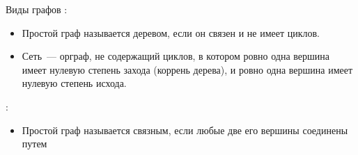 \documentclass[unicode,11pt,notheorems]{beamer}
\begin{document}


\begin{frame}{Виды графов}
:
\begin{itemize}

	\item 
		Простой граф называется \alert{деревом}, если он  связен и не имеет циклов.
	\item 
		\alert{Сеть}~--- орграф, не содержащий циклов, в котором ровно одна вершина имеет нулевую степень захода (\alert{коррень дерева}), и ровно одна вершина имеет нулевую степень исхода.	
\end{itemize}

:
\begin{itemize}
	\item Простой граф называется \alert{связным}, если любые две его вершины соединены путем


\end{itemize}
\end{frame}
\end{document}
